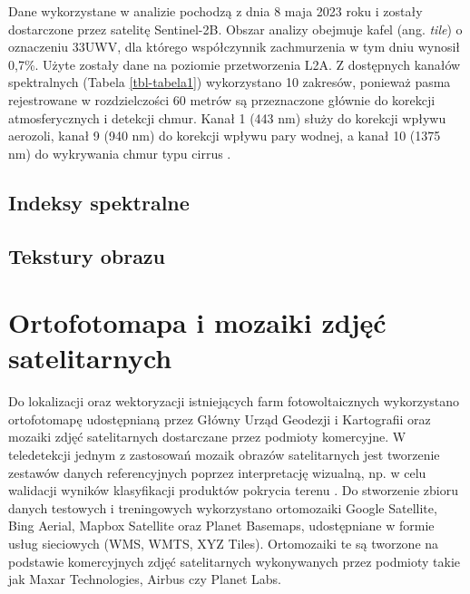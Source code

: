 \documentclass{amuthesis}
\begin{document}
Dane wykorzystane w analizie pochodzą z dnia 8 maja 2023 roku i zostały
dostarczone przez satelitę Sentinel-2B. Obszar analizy obejmuje kafel
(ang. \emph{tile}) o oznaczeniu 33UWV, dla którego współczynnik
zachmurzenia w tym dniu wynosił 0,7\%. Użyte zostały dane na poziomie
przetworzenia L2A. Z dostępnych kanałów spektralnych (Tabela
\ref{tbl-tabela1}) wykorzystano 10 zakresów, ponieważ pasma rejestrowane
w rozdzielczości 60 metrów są przeznaczone głównie do korekcji
atmosferycznych i detekcji chmur. Kanał 1 (443 nm) służy do korekcji
wpływu aerozoli, kanał 9 (940 nm) do korekcji wpływu pary wodnej, a
kanał 10 (1375 nm) do wykrywania chmur typu cirrus
\autocite{drusch_2012_sen2GMES}.

\hypertarget{indeksy-spektralne}{%
\subsection{Indeksy spektralne}\label{indeksy-spektralne}}

\hypertarget{tekstury-obrazu}{%
\subsection{Tekstury obrazu}\label{tekstury-obrazu}}

\hypertarget{sec-mosaics}{%
\section{Ortofotomapa i mozaiki zdjęć satelitarnych}\label{sec-mosaics}}

Do lokalizacji oraz wektoryzacji istniejących farm fotowoltaicznych
wykorzystano ortofotomapę udostępnianą przez Główny Urząd Geodezji i
Kartografii oraz mozaiki zdjęć satelitarnych dostarczane przez podmioty
komercyjne. W teledetekcji jednym z zastosowań mozaik obrazów
satelitarnych jest tworzenie zestawów danych referencyjnych poprzez
interpretację wizualną, np. w celu walidacji wyników klasyfikacji
produktów pokrycia terenu \autocite{lesiv_2018_sat_imagery_mosaics}. Do
stworzenie zbioru danych testowych i treningowych wykorzystano
ortomozaiki Google Satellite, Bing Aerial, Mapbox Satellite oraz Planet
Basemaps, udostępniane w formie usług sieciowych (WMS, WMTS, XYZ Tiles).
Ortomozaiki te są tworzone na podstawie komercyjnych zdjęć satelitarnych
wykonywanych przez podmioty takie jak Maxar Technologies, Airbus czy
Planet Labs.
\end{document}
